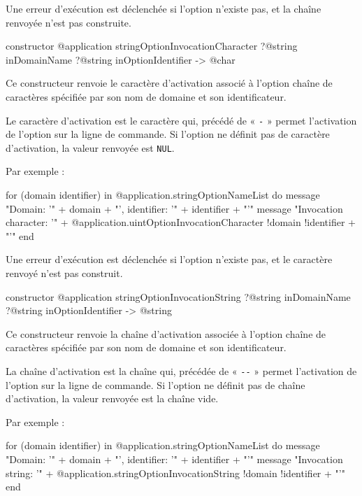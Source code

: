 Une erreur d'exécution est déclenchée si l'option n'existe pas, et la chaîne renvoyée n'est pas construite.



\begin{galgasbox}
constructor @application stringOptionInvocationCharacter
    ?@string inDomainName
    ?@string inOptionIdentifier -> @char
\end{galgasbox}

Ce constructeur renvoie le caractère d'activation associé à l'option chaîne de caractères spécifiée par son nom de domaine et son identificateur.

Le caractère d'activation est le caractère qui, précédé de « \texttt{-} » permet l'activation de l'option sur la ligne de commande. Si l'option ne définit pas de caractère d'activation, la valeur renvoyée est \texttt{NUL}.

 Par exemple :
\begin{galgas}
for (domain identifier) in @application.stringOptionNameList do
  message "Domain: '" + domain + "', identifier: '" + identifier + "'\n"
  message "Invocation character: '"
    + @application.uintOptionInvocationCharacter {!domain !identifier} + "'\n"
end
\end{galgas}

Une erreur d'exécution est déclenchée si l'option n'existe pas, et le caractère renvoyé n'est pas construit.



\begin{galgasbox}
constructor @application stringOptionInvocationString
    ?@string inDomainName
    ?@string inOptionIdentifier -> @string
\end{galgasbox}

Ce constructeur renvoie la chaîne d'activation associée à l'option chaîne de caractères spécifiée par son nom de domaine et son identificateur.

La chaîne d'activation est la chaîne qui, précédée de « \texttt{-{}-} » permet l'activation de l'option sur la ligne de commande. Si l'option ne définit pas de chaîne d'activation, la valeur renvoyée est la chaîne vide.

 Par exemple :
\begin{galgas}
for (domain identifier) in @application.stringOptionNameList do
  message "Domain: '" + domain + "', identifier: '" + identifier + "'\n"
  message "Invocation string: '"
    + @application.stringOptionInvocationString {!domain !identifier} + "'\n"
end
\end{galgas}

